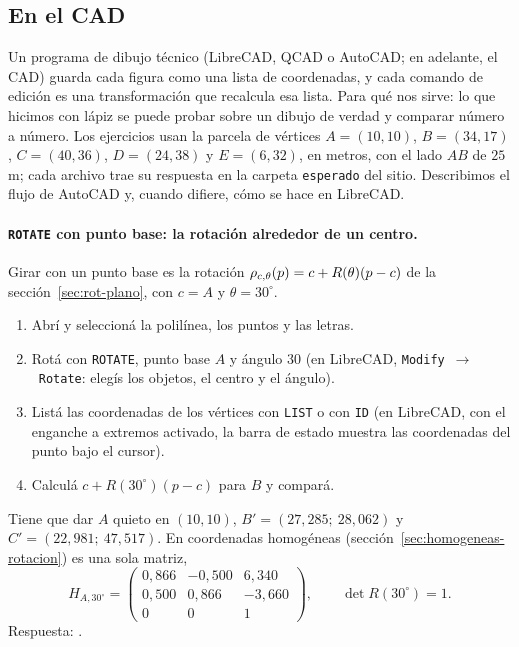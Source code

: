 
\subsection{En el CAD}\label{sec:cad-cap01}

Un programa de dibujo técnico (LibreCAD, QCAD o AutoCAD; en adelante, el CAD) guarda cada
figura como una lista de coordenadas, y cada comando de edición es una transformación que
recalcula esa lista. Para qué nos sirve: lo que hicimos con lápiz se puede probar sobre un dibujo
de verdad y comparar número a número. Los ejercicios usan la parcela de vértices \(A=(10,10)\),
\(B=(34,17)\), \(C=(40,36)\), \(D=(24,38)\) y \(E=(6,32)\), en metros, con el lado \(AB\) de
\(25\) m; cada archivo trae su respuesta en la carpeta \texttt{esperado} del sitio. Describimos
el flujo de AutoCAD y, cuando difiere, cómo se hace en LibreCAD.

\paragraph{\texttt{ROTATE} con punto base: la rotación alrededor de un centro.} Girar con un
punto base es la rotación \(\rho_{c,\theta}(p)=c+R(\theta)(p-c)\) de la
sección~\ref{sec:rot-plano}, con \(c=A\) y \(\theta=30^\circ\).
\begin{enumerate}
  \item Abrí  y seleccioná la polilínea, los puntos y las letras.
  \item Rotá con \texttt{ROTATE}, punto base \(A\) y ángulo \(30\) (en LibreCAD, \texttt{Modify}~\(\to\)~\texttt{Rotate}: elegís los objetos, el centro y el ángulo).
  \item Listá las coordenadas de los vértices con \texttt{LIST} o con \texttt{ID} (en LibreCAD,
  con el enganche a extremos activado, la barra de estado muestra las coordenadas del punto
  bajo el cursor).
  \item Calculá \(c+R(30^\circ)(p-c)\) para \(B\) y compará.
\end{enumerate}
Tiene que dar \(A\) quieto en \((10,10)\), \(B'=(27{,}285;\ 28{,}062)\) y
\(C'=(22{,}981;\ 47{,}517)\). En coordenadas homogéneas
(sección~\ref{sec:homogeneas-rotacion}) es una sola matriz,
\[
H_{A,30^\circ}=\begin{pmatrix}0{,}866&-0{,}500&6{,}340\\0{,}500&0{,}866&-3{,}660\\0&0&1\end{pmatrix},
\qquad \det R(30^\circ)=1.
\]
Respuesta: .

